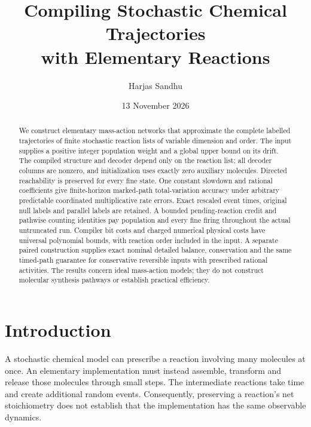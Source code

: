 \documentclass[11pt,reqno]{amsart}
\theoremstyle{definition}
\theoremstyle{remark}
\begin{document}
\title[Elementary stochastic trajectory compilation]{Compiling Stochastic Chemical Trajectories\\ with Elementary Reactions}
\author{Harjas Sandhu}
\address{The University of Queensland, Brisbane, Australia}
\date{13 November 2026}
\begin{abstract}
We construct elementary mass-action networks that approximate the complete
labelled trajectories of finite stochastic reaction lists of variable dimension
and order. The input supplies a positive integer population weight and a global
upper bound on its drift. The compiled structure and decoder depend only on the
reaction list; all decoder columns are nonzero, and initialization uses exactly
zero auxiliary molecules. Directed reachability is preserved for every fine
state. One constant slowdown and rational coefficients give finite-horizon
marked-path total-variation accuracy under arbitrary predictable coordinated
multiplicative rate errors. Exact rescaled event times, original null labels and
parallel labels are retained. A bounded pending-reaction credit and pathwise
counting identities pay population and every fine firing throughout the actual
untruncated run. Compiler bit costs and charged numerical physical costs have
universal polynomial bounds, with reaction order included in the input.
A separate paired construction supplies exact nominal detailed balance,
conservation and the same timed-path guarantee for conservative reversible
inputs with prescribed rational activities. The results concern ideal
mass-action models; they do not construct molecular synthesis pathways or
establish practical efficiency.
\end{abstract}
\maketitle
\tableofcontents
\section{Introduction}
A stochastic chemical model can prescribe a reaction involving many molecules
at once. An elementary implementation must instead assemble, transform and
release those molecules through small steps. The intermediate reactions take
time and create additional random events. Consequently, preserving a
reaction's net stoichiometry does not establish that the implementation has the
same observable dynamics.
\end{document}
